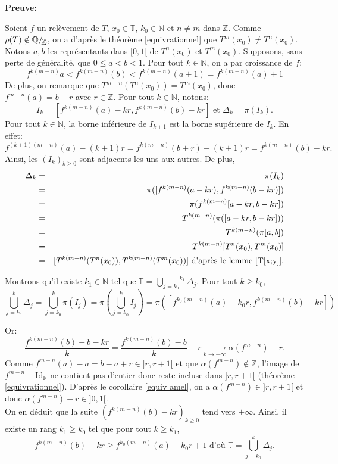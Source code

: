 \documentclass[11pt,a4 paper]{article}
\newcommand{\Tbb}{\mathbb{T}}
\newcommand{\Rbb}{\mathbb{R}}
\newcommand{\Qbb}{\mathbb{Q}}
\newcommand{\Zbb}{\mathbb{Z}}
\newcommand{\Nbb}{\mathbb{N}}
\newcommand{\Id}{\mathrm{Id}}
\newcommand*{\EnsembleQuotient}[2]%
{\ensuremath{%
		#1/\!\raisebox{-.65ex}{\ensuremath{\mathcal{#2}}}}}
\begin{document}
	\textbf{Preuve:}	
	\par Soient $f$ un relèvement de $T$, $x_0 \in \Tbb$, $k_0 \in \Nbb$ et $n\neq m$ dans $\Zbb$. Comme $\rho(T) \notin \EnsembleQuotient{\Qbb}{\Zbb}$, on a d'après le théorème \ref{equivrationnel} que $T^m(x_0)\neq T^n(x_0)$. Notons $a,b$ les représentants dans $[0,1[$ de $T^n(x_0)$ et $T^m(x_0)$. Supposons, sans perte de généralité, que $0\leq a<b<1$. Pour tout $k \in \Nbb$, on a par croissance de $f$:
	$$f^{k(m-n)}a<f^{k(m-n)}(b)<f^{k(m-n)}(a+1)=f^{k(m-n)}(a)+1$$
	De plus, on remarque que $T^{m-n}(T^n(x_0))=T^m(x_0)$, donc $f^{m-n}(a)=b+r$ avec $r\in \Zbb$. Pour tout $k\in \Nbb$, notons:
	$$I_k=[f^{k(m-n)}(a)-kr,f^{k(m-n)}(b)-kr]\text{ et } \Delta_k=\pi(I_k).$$
	Pour tout $k\in \Nbb$, la borne inférieure de $I_{k+1}$ est la borne supérieure de $I_k$. En effet:
	$$f^{(k+1)(m-n)}(a)-(k+1)r=f^{k(m-n)}(b+r)-(k+1)r=f^{k(m-n)}(b)-kr.$$
	Ainsi, les $(I_k)_{k\geq 0}$ sont adjacents les uns aux autres. De plus,
	\begin{eqnarray*}
		\Delta_k&=&\pi(I_k)\\
			&=&\pi([f^{k(m-n)}(a-kr),f^{k(m-n)}(b-kr)])\\
			&=&\pi( f^{k(m-n)}[a-kr,b-kr])\\
			&=&T^{k(m-n)}(\pi([a-kr,b-kr]))\\
			&=&T^{k(m-n)}(\pi[a,b])\\
			&=&T^{k(m-n)}[T^n(x_0),T^m(x_0)]\\
			&=&[T^{k(m-n)}(T^n(x_0)),T^{k(m-n)}(T^m(x_0))]\text{ d'après le lemme \ref{T[x;y]}}.
	\end{eqnarray*}
	
	
	\par Montrons qu'il existe $k_1\in \mathbb{N}$ tel que $\Tbb=\overset{k_1}{\underset{j=k_0}{\bigcup}}\Delta_j.$ Pour tout $k\geq k_0$,
	$$\overset{k}{\underset{j=k_0}{\bigcup}}\Delta_j=\overset{k}{\underset{j=k_0}{\bigcup}}\pi(I_j)=\pi(\overset{k}{\underset{j=k_0}{\bigcup}}I_j)=\pi([f^{k_0(m-n)}(a)-k_0r,f^{k(m-n)}(b)-kr])$$

	Or: 
	$$\frac{f^{k(m-n)}(b)-b-kr}{k}=\frac{f^{k(m-n)}(b)-b}{k}-r\underset{k\to +\infty}{\longrightarrow}\alpha(f^{m-n})-r.	$$
	Comme $f^{m-n}(a)-a=b-a+r \in ]r,r+1[$ et que $\alpha(f^{m-n})\notin \Zbb$, l'image de $f^{m-n} - \Id_{\Rbb}$ ne contient pas d'entier donc reste incluse dans $]r,r+1[$ (théorème \ref{equivrationnel}). D'après le corollaire \ref{equiv amel}, on a $\alpha(f^{m-n})\in ]r,r+1[$ et donc $\alpha(f^{m-n})-r \in ]0,1[$.\\ On en déduit que la suite $(f^{k(m-n)}(b)-kr)_{k\geq0}$ tend vers $+\infty$. Ainsi, il existe un rang $k_1\geq k_0$ tel que pour tout $k\geq k_1$,
	$$f^{k(m-n)}(b)-kr\geq f^{k_0(m-n)}(a)-k_0r +1 \text{ d'où } \Tbb=\overset{k}{\underset{j=k_0}{\bigcup}}\Delta_j.$$
	
\end{document}
